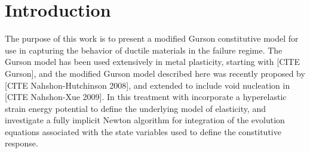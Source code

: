 \chapter{Introduction}
\label{intro}

The purpose of this work is to present a modified Gurson constitutive
model for use in capturing the behavior of ductile materials in the
failure regime. The Gurson model has been used extensively in metal
plasticity, starting with [CITE Gurson], and the modified Gurson model
described here was recently proposed by [CITE Nahshon-Hutchinson
  2008], and extended to include void nucleation in [CITE Nahshon-Xue
  2009]. In this treatment with incorporate a hyperelastic strain
energy potential to define the underlying model of elasticity, and
investigate a fully implicit Newton algorithm for integration of the
evolution equations associated with the state variables used to define
the constitutive response. 

